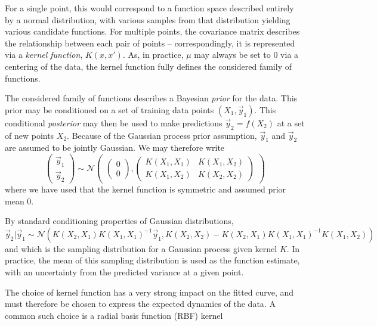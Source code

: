 For a single point, this would correspond to a function space described entirely by a normal distribution, 
with various samples from that distribution yielding various candidate functions. For multiple points, the 
covariance matrix describes the relationship between each pair of points -- correspondingly, it is represented 
via a \emph{kernel function}, $K(x, x')$. As, in practice, $\mu$ may always be set to 0 via a centering of the 
data, the kernel function fully defines the considered family of functions.

The considered family of functions describes a Bayesian \emph{prior} for the data. This prior may be conditioned 
on a set of training data points $(X_{1}, \vec{y}_1)$. This conditional \emph{posterior} may then be used to make 
predictions $\vec{y}_2 = f(X_2)$ at a set of new points $X_2$. Because of the Gaussian process prior assumption, 
$\vec{y}_1$ and $\vec{y}_2$ are assumed to be jointly Gaussian. We may therefore write
\begin{equation}
\begin{pmatrix}\vec{y}_1 \\ \vec{y}_2\end{pmatrix} \sim 
\mathcal{N}\begin{pmatrix}\begin{pmatrix}0\\0 \end{pmatrix}, 
\begin{pmatrix}K(X_1, X_1) & K(X_1, X_2)\\ K(X_1, X_2) & K(X_2, X_2)\end{pmatrix}\end{pmatrix}
\end{equation}
where we have used that the kernel function is symmetric and assumed prior mean 0. 

By standard conditioning properties of Gaussian distributions, 
\begin{equation}
\vec{y}_2 | \vec{y}_1 \sim \mathcal{N}(K(X_2, X_1)K(X_1,X_1)^{-1}\vec{y}_1, K(X_2, X_2)-K(X_2,X_1)K(X_1,X_1)^{-1}K(X_1, X_2))
\end{equation}
and which is the sampling distribution for a Gaussian process given kernel $K$. In practice, the 
mean of this sampling distribution is used as the function estimate, with an uncertainty from the
predicted variance at a given point.

The choice of kernel function has a very strong impact on the fitted curve, and must therefore be chosen to 
express the expected dynamics of the data. A common such choice is a radial basis function (RBF) kernel
